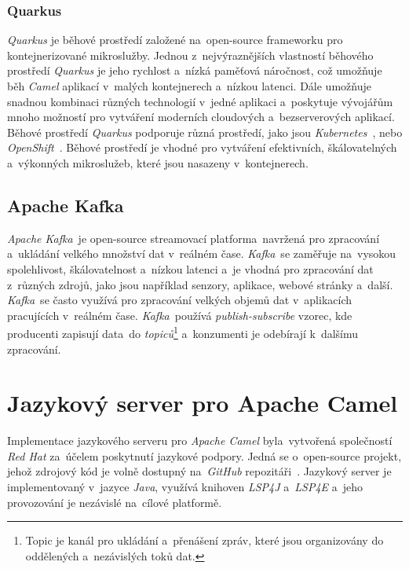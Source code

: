\subsubsection{Quarkus}
\emph{Quarkus} je běhové prostředí založené na~open-source frameworku pro kontejnerizované mikroslužby. Jednou z~nejvýraznějších vlastností běhového prostředí \emph{Quarkus} je jeho rychlost a~nízká paměťová  náročnost, což umožňuje běh \emph{Camel} aplikací v~malých kontejnerech a~nízkou latenci. Dále umožňuje snadnou kombinaci různých technologií v~jedné aplikaci a~poskytuje vývojářům mnoho možností pro vytváření moderních cloudových a~bezserverových aplikací. Běhové prostředí \emph{Quarkus} podporuje různá prostředí, jako jsou \emph{Kubernetes}~\cite{Kubernetes}, nebo \emph{OpenShift}~\cite{OpenShift}. Běhové prostředí je vhodné pro vytváření efektivních, škálovatelných a~výkonných mikroslužeb, které jsou nasazeny v~kontejnerech.

\subsection{Apache Kafka}
\label{camelApacheKafka}
\emph{Apache Kafka}~je open-source streamovací platforma~navržená pro zpracování a~ukládání velkého množství dat v~reálném čase. \emph{Kafka}~se zaměřuje na~vysokou spolehlivost, škálovatelnost a~nízkou latenci a~je vhodná pro zpracování dat z~různých zdrojů, jako jsou například senzory, aplikace, webové stránky a~další. \emph{Kafka}~se často využívá pro zpracování velkých objemů dat v~aplikacích pracujících v~reálném čase. \emph{Kafka}~používá \emph{publish-subscribe} vzorec, kde producenti zapisují data~do \emph{topiců}\footnote{Topic je kanál pro ukládání a~přenášení zpráv, které jsou organizovány do oddělených a~nezávislých toků dat.} a~konzumenti je odebírají k~dalšímu zpracování.

\section{Jazykový server pro Apache Camel}
\label{jazykovyServerApacheCamel}
Implementace jazykového serveru pro \emph{Apache Camel} byla~vytvořená společností \emph{Red Hat} za~účelem poskytnutí jazykové podpory. Jedná se o~open-source projekt, jehož zdrojový kód je volně dostupný na~\emph{GitHub} repozitáři~\cite{CamelLanguageServerGithub}. Jazykový server je implementovaný v~jazyce \emph{Java}, využívá knihoven \emph{LSP4J} a~\emph{LSP4E} a~jeho provozování je nezávislé na~cílové platformě. 

